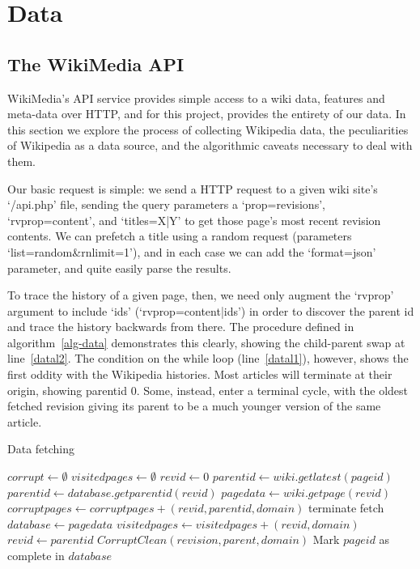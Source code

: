 \chapter{Data}

\section{The WikiMedia API}
WikiMedia's API service provides simple access to a wiki data,
features and meta-data over HTTP,\cite{wiki-api} and for this project,
provides the entirety of our data. In this section we explore the
process of collecting Wikipedia data, the peculiarities of Wikipedia
as a data source, and the algorithmic caveats necessary to deal with
them.

Our basic request is simple: we send a HTTP request to a given wiki
site's `/api.php' file, sending the query parameters a
`prop=revisions', `rvprop=content', and `titles=X|Y' to get those
page's most recent revision contents. We can prefetch a title using a
random request (parameters `list=random\&rnlimit=1'), and in each case
we can add the `format=json' parameter, and quite easily parse the
results. 

To trace the history of a given page, then, we need only augment the
`rvprop' argument to include `ids' (`rvprop=content|ids') in order to
discover the parent id and trace the history backwards from there. The
procedure defined in algorithm~\ref{alg-data} demonstrates this
clearly, showing the child-parent swap at line~\ref{datal2}. The
condition on the while loop (line~\ref{datal1}), however, shows the
first oddity with the Wikipedia histories. Most articles will
terminate at their origin, showing parentid 0. Some, instead, enter a
terminal cycle, with the oldest fetched revision giving its parent to
be a much younger version of the same article. 

\begin{algorithm}
  \caption{Data fetching}\label{alg-data}
  \begin{algorithmic}
    \State $corrupt \gets \emptyset$
    \State $visitedpages \gets \emptyset$
    \State $revid \gets 0$
    \State $parentid \gets wiki.getlatest(pageid)$
    \label{datal1} 
    \State $parentid \gets database.getparentid(revid)$
    \Else
    \State $pagedata \gets wiki.getpage(revid)$
    \EndIf
    \label{datal3}
    \State $corruptpages \gets corruptpages + (revid, parentid, domain)$
    \Else
    \State terminate fetch
    \EndIf
    \Else
    \State $database \gets page data$
    \EndIf
    \State $visitedpages \gets visitedpages + (revid, domain)$
    \State $revid \gets parentid$\label{datal2}
    \EndWhile
    \State $CorruptClean(revision, parent, domain)$
    \EndFor
    \State Mark $pageid$ as complete in $database$
    \EndProcedure
  \end{algorithmic}
\end{algorithm}

